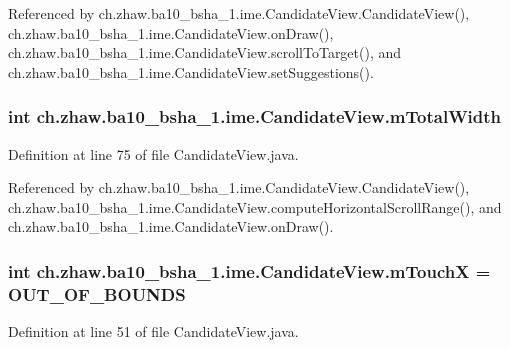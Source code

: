 Referenced by ch.zhaw.ba10\_\-bsha\_\-1.ime.CandidateView.CandidateView(), ch.zhaw.ba10\_\-bsha\_\-1.ime.CandidateView.onDraw(), ch.zhaw.ba10\_\-bsha\_\-1.ime.CandidateView.scrollToTarget(), and ch.zhaw.ba10\_\-bsha\_\-1.ime.CandidateView.setSuggestions().\hypertarget{classch_1_1zhaw_1_1ba10__bsha__1_1_1ime_1_1CandidateView_aba0e07a01b1f5624c5acba0b22733d39}{
\subsubsection[{mTotalWidth}]{\setlength{\rightskip}{0pt plus 5cm}int {\bf ch.zhaw.ba10\_\-bsha\_\-1.ime.CandidateView.mTotalWidth}}}
\label{classch_1_1zhaw_1_1ba10__bsha__1_1_1ime_1_1CandidateView_aba0e07a01b1f5624c5acba0b22733d39}


Definition at line 75 of file CandidateView.java.

Referenced by ch.zhaw.ba10\_\-bsha\_\-1.ime.CandidateView.CandidateView(), ch.zhaw.ba10\_\-bsha\_\-1.ime.CandidateView.computeHorizontalScrollRange(), and ch.zhaw.ba10\_\-bsha\_\-1.ime.CandidateView.onDraw().\hypertarget{classch_1_1zhaw_1_1ba10__bsha__1_1_1ime_1_1CandidateView_af8a46c24bf29d609f187c805b7e0975c}{
\subsubsection[{mTouchX}]{\setlength{\rightskip}{0pt plus 5cm}int {\bf ch.zhaw.ba10\_\-bsha\_\-1.ime.CandidateView.mTouchX} = {\bf OUT\_\-OF\_\-BOUNDS}}}
\label{classch_1_1zhaw_1_1ba10__bsha__1_1_1ime_1_1CandidateView_af8a46c24bf29d609f187c805b7e0975c}


Definition at line 51 of file CandidateView.java.

